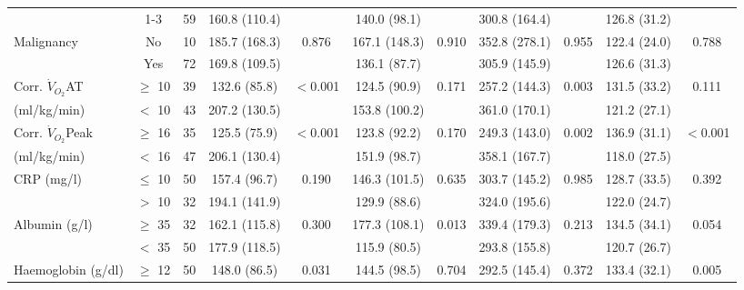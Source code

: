 \begin{sidewaystable}[p]
\begin{tabular}{|l c c | c c| c c | c c | c c|}
		                          & 1-3       & 59 & 160.8 (110.4) &                       & 140.0 (98.1)  &                   & 300.8 (164.4) &                & 126.8 (31.2) &  \\
		Malignancy                 & No    & 10 & 185.7 (168.3) & 0.876                 & 167.1 (148.3) & 0.910             & 352.8 (278.1) & 0.955          & 122.4 (24.0) & 0.788                 \\
		                          & Yes & 72 & 169.8 (109.5) &                       & 136.1 (87.7)  &                   & 305.9 (145.9) &                & 126.6 (31.3) &  \\
		Corr. $\dot{V}_{O_2}$AT   & $\geq$ 10 & 39 & 132.6 (85.8)  & $<$0.001              & 124.5 (90.9)  & 0.171             & 257.2 (144.3) & 0.003          & 131.5 (33.2) & 0.111                 \\
		(ml/kg/min)              & $<$ 10    & 43 & 207.2 (130.5) &                       & 153.8 (100.2) &                   & 361.0 (170.1) &                & 121.2 (27.1) &  \\
		Corr. $\dot{V}_{O_2}$Peak & $\geq$ 16 & 35 & 125.5 (75.9)  & $<$0.001              & 123.8 (92.2)  & 0.170             & 249.3 (143.0) & 0.002          & 136.9 (31.1) & $<$0.001              \\
		(ml/kg/min)              & $<$ 16    & 47 & 206.1 (130.4) &                       & 151.9 (98.7)  &                   & 358.1 (167.7) &                & 118.0 (27.5) &  \\
		CRP (mg/l)                & $\leq$ 10 & 50 & 157.4 (96.7)  & 0.190                 & 146.3 (101.5) & 0.635             & 303.7 (145.2) & 0.985          & 128.7 (33.5) & 0.392                 \\
		                          & $>$ 10    & 32 & 194.1 (141.9) &                       & 129.9 (88.6)  &                   & 324.0 (195.6) &                & 122.0 (24.7) &  \\
		Albumin (g/l)             & $\geq$ 35 & 32 & 162.1 (115.8) & 0.300                 & 177.3 (108.1) & 0.013             & 339.4 (179.3) & 0.213          & 134.5 (34.1) & 0.054                 \\
		                          & $<$ 35    & 50 & 177.9 (118.5) &                       & 115.9 (80.5)  &                   & 293.8 (155.8) &                & 120.7 (26.7) &  \\
		Haemoglobin (g/dl)        & $\geq$ 12 & 50 & 148.0 (86.5)  & 0.031                 & 144.5 (98.5)  & 0.704             & 292.5 (145.4) & 0.372          & 133.4 (32.1) & 0.005                 \\

\end{tabular}
\end{sidewaystable}

